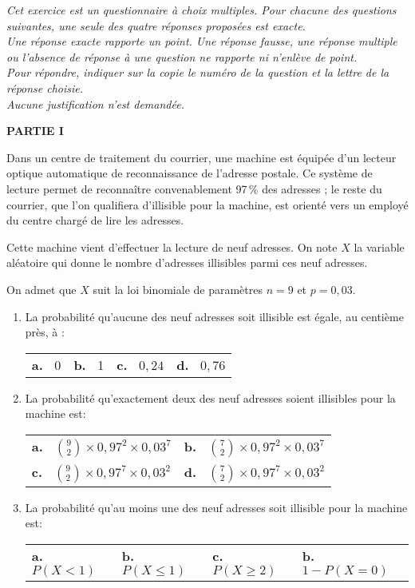 
\medskip

\emph{Cet exercice est un questionnaire à choix multiples. Pour chacune des questions suivantes, une seule des quatre réponses proposées est exacte.\\ Une réponse exacte rapporte un point. Une réponse fausse, une réponse multiple ou l'absence de réponse à une question ne rapporte ni n'enlève de point.\\ Pour répondre, indiquer sur la copie le numéro de la question et la lettre de la réponse choisie.\\ Aucune justification n'est demandée.}

\bigskip

\textbf{PARTIE I}

\medskip

Dans un centre de traitement du courrier, une machine est équipée d'un lecteur optique automatique de reconnaissance de l'adresse postale. Ce système de lecture permet de reconnaître convenablement 97\,\% des adresses ; le reste du courrier, que l'on qualifiera d'illisible pour la machine, est orienté vers un employé du centre chargé de lire les adresses. 

Cette machine vient d'effectuer la lecture de neuf adresses. On note $X$ la variable aléatoire qui donne le nombre d'adresses illisibles parmi ces neuf adresses.

On admet que $X$ suit la loi binomiale de paramètres $n = 9$ et $p = 0,03$.

\medskip


\begin{enumerate}
\item La probabilité qu'aucune des neuf adresses soit illisible est égale, au centième près, à :
\begin{center}
\begin{tabularx}{\linewidth}{*{4}{X}}
\textbf{a.~} 0 &\textbf{b.~} 1 &\textbf{c.~} $0,24$ &\textbf{d.~} $0,76$
\end{tabularx}
\end{center}
\item  La probabilité qu'exactement deux des neuf adresses soient illisibles pour la machine est:
\begin{center}
\begin{tabularx}{\linewidth}{*{2}{X}}
\textbf{a.~} $\binom{9}{2} \times  0,97^2 \times 0,03^7$ &\textbf{b.~} $\binom{7}{2} \times  0,97^2 \times 0,03^7$\\
\textbf{c.~} $\binom{9}{2} \times 0,97^7 \times  0,03^2$ &\textbf{d.~} $\binom{7}{2} \times 0,97^7 \times 0,03^2$
\end{tabularx}
\end{center}
\item  La probabilité qu'au moins une des neuf adresses soit illisible pour la machine est:
\begin{center}
\begin{tabularx}{\linewidth}{*{4}{X}}
\textbf{a.~} $P(X < 1)$ &\textbf{b.~} $P(X \leqslant 1)$ &\textbf{c.~} $P(X \geqslant 2)$ &\textbf{b.~} $1- P(X = 0)$ 
\end{tabularx}
\end{center}
\end{enumerate}

